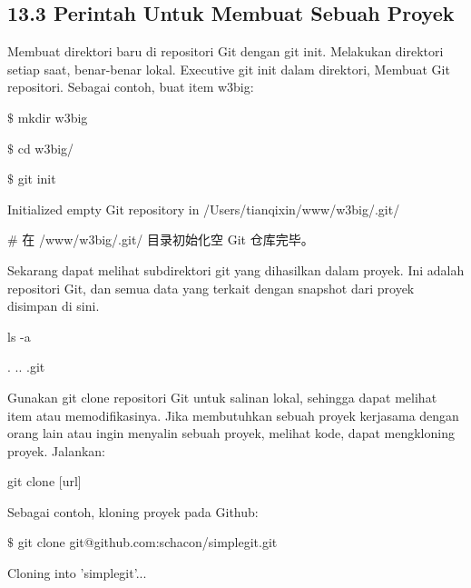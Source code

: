 \subsection*{13.3 Perintah Untuk Membuat Sebuah Proyek }
 \par
Membuat direktori baru di repositori Git dengan git init. Melakukan direktori setiap saat, benar-benar lokal. Executive git init dalam direktori, Membuat Git repositori. Sebagai contoh, buat item w3big:  \par
\noindent 
{\fontsize{10pt}{10pt}\selectfont  $  \$  $ mkdir w3big} \par
\noindent 
{\fontsize{10pt}{10pt}\selectfont  $  \$  $ cd w3big/} \par
\noindent 
{\fontsize{10pt}{10pt}\selectfont  $  \$  $ git init} \par
\noindent 
{\fontsize{10pt}{10pt}\selectfont Initialized empty Git repository in /Users/tianqixin/www/w3big/.git/} \par
\noindent 
{\fontsize{10pt}{10pt}\selectfont  $  \#  $ 在 /www/w3big/.git/ 目录初始化空 Git 仓库完毕。} \par
\vspace{14pt}
Sekarang dapat melihat subdirektori git yang dihasilkan dalam proyek. Ini adalah repositori Git, dan semua data yang terkait dengan snapshot dari proyek disimpan di sini. \par
\noindent 
{\fontsize{10pt}{10pt}\selectfont ls -a} \par
\noindent 
{\fontsize{10pt}{10pt}\selectfont . \hspace*{0.64in} .. \hspace*{0.64in} .git} \par
\vspace{12pt}
Gunakan git clone repositori Git untuk salinan lokal, sehingga dapat melihat item atau memodifikasinya. Jika membutuhkan sebuah proyek kerjasama dengan orang lain atau ingin menyalin sebuah proyek, melihat kode, dapat mengkloning proyek. Jalankan:  \par
\noindent 
{\fontsize{10pt}{10pt}\selectfont git clone [url]} \par
\vspace{12pt}
\noindent 
Sebagai contoh, kloning proyek pada Github: \par
\noindent 
{\fontsize{10pt}{10pt}\selectfont  $  \$  $ git clone git@github.com:schacon/simplegit.git} \par
\noindent 
{\fontsize{10pt}{10pt}\selectfont Cloning into 'simplegit'...} \par
